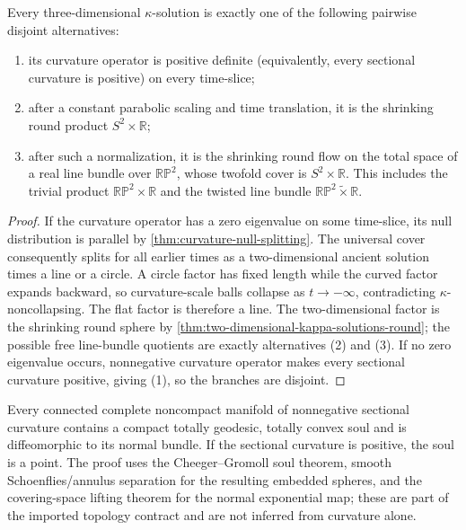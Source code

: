 \begin{proposition}
\label{prop:kappa-solution-curvature-trichotomy}
\notready
Every three-dimensional $\kappa$-solution is exactly one of the following
pairwise disjoint alternatives:
\begin{enumerate}
\item its curvature operator is positive definite (equivalently, every
      sectional curvature is positive) on every time-slice;
\item after a constant parabolic scaling and time translation, it is the
      shrinking round product $S^2\times\mathbb R$;
\item after such a normalization, it is the shrinking round flow on the
      total space of a real line bundle over $\mathbb{RP}^2$, whose twofold
      cover is $S^2\times\mathbb R$.  This includes the trivial product
      $\mathbb{RP}^2\times\mathbb R$ and the twisted line bundle
      $\mathbb{RP}^2\widetilde\times\mathbb R$.
\end{enumerate}
\end{proposition}

\begin{proof}
If the curvature operator has a zero eigenvalue on some time-slice, its null
distribution is parallel by \ref{thm:curvature-null-splitting}.  The universal
cover consequently splits for all earlier times as a two-dimensional ancient
solution times a line or a circle.  A circle factor has fixed length while the
curved factor expands backward, so curvature-scale balls collapse as
$t\to-\infty$, contradicting $\kappa$-noncollapsing.  The flat factor is
therefore a line.  The two-dimensional factor is the shrinking round sphere
by \ref{thm:two-dimensional-kappa-solutions-round}; the possible free
line-bundle quotients are exactly alternatives (2) and (3).  If no zero
eigenvalue occurs, nonnegative curvature operator makes every sectional
curvature positive, giving (1), so the branches are disjoint.
\end{proof}

\begin{theorem}
\label{thm:soul-structure-nonnegative-curvature}
\notready
Every connected complete noncompact manifold of nonnegative sectional
curvature contains a compact totally geodesic, totally convex soul and is
diffeomorphic to its normal bundle.  If the sectional curvature is positive,
the soul is a point.  The proof uses the Cheeger--Gromoll soul theorem,
smooth Schoenflies/annulus separation for the resulting embedded spheres, and
the covering-space lifting theorem for the normal exponential map; these are
part of the imported topology contract and are not inferred from curvature
alone.
\end{theorem}

